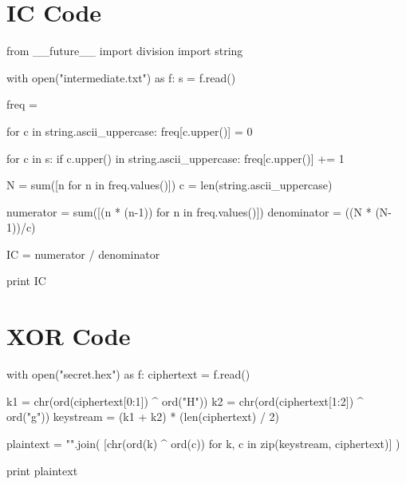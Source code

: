 \documentclass[11pt,a4paper,twoside]{article}
\begin{document}
\section{IC Code}
\label{IC_code}
\begin{python}
from __future__ import division
import string

with open("intermediate.txt") as f: 
    s = f.read()

    freq = {}

    for c in string.ascii_uppercase:
        freq[c.upper()] = 0

    for c in s:
        if c.upper() in string.ascii_uppercase:
            freq[c.upper()] += 1
                           
    N = sum([n for n in freq.values()])
    c = len(string.ascii_uppercase)

    numerator = sum([(n * (n-1)) for n in freq.values()]) 
    denominator = ((N * (N-1))/c)

    IC = numerator / denominator 

    print IC
\end{python}

\section{XOR Code}
\label{XOR_code}
\begin{python}
with open("secret.hex") as f:
    ciphertext = f.read()

    k1 = chr(ord(ciphertext[0:1]) ^ ord("H"))
    k2 = chr(ord(ciphertext[1:2]) ^ ord("g"))
    keystream = (k1 + k2) * (len(ciphertext) / 2)

    plaintext = "".join(
            [chr(ord(k) ^ ord(c)) 
             for k, c in zip(keystream, ciphertext)]
    )

    print plaintext
\end{python}
\end{document}
